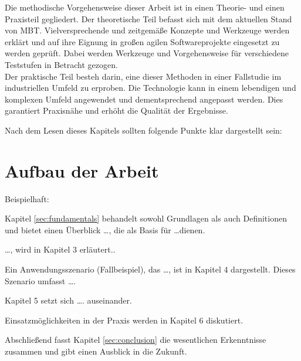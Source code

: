Die methodische Vorgehensweise dieser Arbeit ist in einen Theorie- und einen Praxisteil gegliedert. Der theoretische Teil befasst sich mit dem aktuellen Stand von \Gls{MBT}. Vielversprechende und zeitgemäße Konzepte und Werkzeuge werden erklärt und auf ihre Eignung in großen agilen Softwareprojekte eingesetzt zu werden geprüft. Dabei werden Werkzeuge und Vorgehensweise für verschiedene Teststufen in Betracht gezogen.\\
Der praktische Teil besteh darin, eine dieser Methoden in einer Fallstudie im industriellen Umfeld zu erproben. Die Technologie kann in einem lebendigen und komplexen Umfeld angewendet und dementsprechend angepasst werden. Dies garantiert Praxisnähe und erhöht die Qualität der Ergebnisse.

\makeatletter\ifthesis@masterthesis
Nach dem Lesen dieses Kapitels sollten folgende Punkte klar dargestellt sein:
\fi\makeatother

\makeatletter\ifthesis@masterthesis
\section{Aufbau der Arbeit}

Beispielhaft:

Kapitel \ref{sec:fundamentals} behandelt sowohl Grundlagen als auch Definitionen und bietet einen Überblick \dots, die als Basis für \dots dienen.

\dots, wird in Kapitel 3 erläutert..

Ein Anwendungsszenario (Fallbeispiel), das \dots, ist in Kapitel 4 dargestellt. Dieses Szenario umfasst \dots.

Kapitel 5 setzt sich \dots. auseinander.

Einsatzmöglichkeiten in der Praxis werden in Kapitel 6 diskutiert.

Abschließend fasst Kapitel \ref{sec:conclusion} die wesentlichen Erkenntnisse zusammen und gibt einen Ausblick in die Zukunft.
\fi\makeatother

